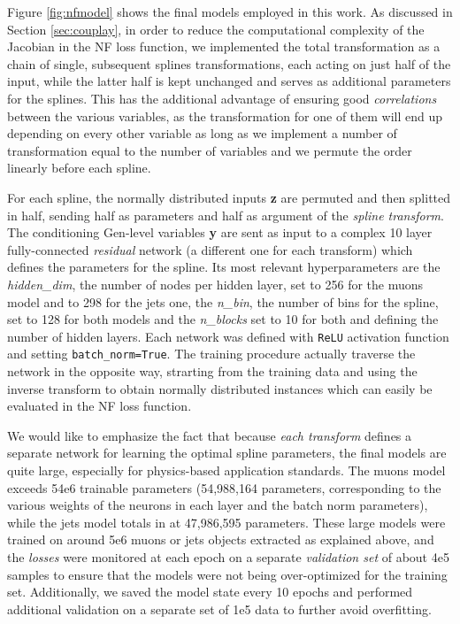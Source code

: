 Figure \ref{fig:nfmodel} shows the final models employed in this work. 
As discussed in Section \ref{sec:couplay}, in order to reduce the computational complexity of the Jacobian in the NF loss function, we implemented the total transformation as a chain of single, subsequent splines transformations, each acting on just half of the input, while the latter half is kept unchanged and serves as additional parameters for the splines. This has the additional advantage of ensuring good \emph{correlations} between the various variables, as the transformation for one of them will end up depending on every other variable as long as we implement a number of transformation equal to the number of variables and we permute the order linearly before each spline.

For each spline, the normally distributed inputs \textbf{z} are permuted and then splitted in half, sending half as parameters and half as argument of the \emph{spline transform}. The conditioning Gen-level variables \textbf{y} are sent as input to a complex 10 layer fully-connected \emph{residual} network (a different one for each transform) which defines the parameters for the spline. Its most relevant hyperparameters are the \emph{hidden\_dim}, the number of nodes per hidden layer, set to 256 for the muons model and to 298 for the jets one, the \emph{n\_bin}, the number of bins for the spline, set to 128 for both models and the \emph{n\_blocks} set to 10 for both and defining the number of hidden layers.
Each network was defined with \texttt{ReLU} activation function and setting \texttt{batch\_norm=True}. The training procedure actually traverse the network in the opposite way, strarting from the training data and using the inverse transform to obtain normally distributed instances which can easily be evaluated in the NF loss function.

We would like to emphasize the fact that because \emph{each transform} defines a separate network for learning the optimal spline parameters, the final models are quite large, especially for physics-based application standards. The muons model exceeds 54e6 trainable parameters (54,988,164 parameters, corresponding to the various weights of the neurons in each layer and the batch norm parameters), while the jets model totals in at 47,986,595 parameters. These large models were trained on around 5e6 muons or jets objects extracted as explained above, and the \emph{losses} were monitored at each epoch on a separate \emph{validation set} of about 4e5 samples to ensure that the models were not being over-optimized for the training set. Additionally, we saved the model state every 10 epochs and performed additional validation on a separate set of 1e5 data to further avoid overfitting.

